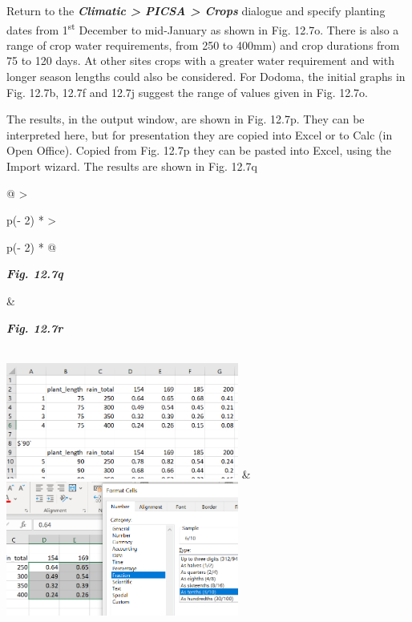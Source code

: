 \documentclass[
  letterpaper,
  DIV=11,
  numbers=noendperiod]{scrreprt}
\begin{document}
Return to the \textbf{\emph{Climatic \textgreater{} PICSA \textgreater{}
Crops}} dialogue and specify planting dates from 1\textsuperscript{st}
December to mid-January as shown in Fig. 12.7o. There is also a range of
crop water requirements, from 250 to 400mm) and crop durations from 75
to 120 days. At other sites crops with a greater water requirement and
with longer season lengths could also be considered. For Dodoma, the
initial graphs in Fig. 12.7b, 12.7f and 12.7j suggest the range of
values given in Fig. 12.7o.

The results, in the output window, are shown in Fig. 12.7p. They can be
interpreted here, but for presentation they are copied into Excel or to
Calc (in Open Office). Copied from Fig. 12.7p they can be pasted into
Excel, using the Import wizard. The results are shown in Fig. 12.7q

\begin{longtable}[]{@{}
  >{\raggedright\arraybackslash}p{(\columnwidth - 2\tabcolsep) * }
  >{\raggedright\arraybackslash}p{(\columnwidth - 2\tabcolsep) * }@{}}
\toprule\noalign{}
\begin{minipage}[b]{\linewidth}\raggedright
\textbf{\emph{Fig. 12.7q}}
\end{minipage} & \begin{minipage}[b]{\linewidth}\raggedright
\textbf{\emph{Fig. 12.7r}}
\end{minipage} \\
\midrule\noalign{}
\endhead
\bottomrule\noalign{}
\endlastfoot
\includegraphics[width=3.0118in,height=1.49984in]{figures/Fig12.7q.png}
&
\includegraphics[width=3.00837in,height=1.74082in]{figures/Fig12.7r.png} \\
\end{longtable}
\end{document}
